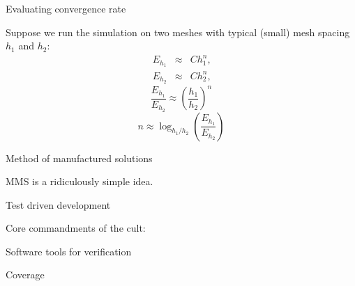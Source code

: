 \documentclass[t]{beamer}
\begin{document}
\begin{frame}{Evaluating convergence rate}

  Suppose we run the simulation on two meshes with typical (small) mesh spacing
  $h_1$ and $h_2$:
  \begin{eqnarray} 
    E_{h_1} & \approx & Ch_1^{n}\textrm{,} \\ E_{h_2} &
    \approx & Ch_2^{n}\textrm{,} 
\end{eqnarray}
\pause
\begin{equation}
  \frac{E_{h_1}}{E_{h_2}} \approx \left(\frac{h_1}{h_2}\right)^n
\end{equation}
\pause
\begin{equation}
  n \approx \log_{h_1/h_2}\left(\frac{E_{h_1}}{E_{h_2}}\right)
\end{equation}

\end{frame}

\begin{frame}{Method of manufactured solutions}

  MMS is a ridiculously simple idea. 
  
\end{frame}

\begin{frame}{Test driven development}
  
  Core commandments of the cult:
  

\end{frame}



\begin{frame}{Software tools for verification}
  
\end{frame}

\begin{frame}{Coverage}
  
\end{frame}
\end{document}
